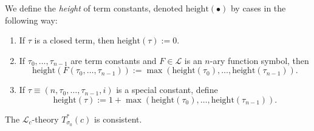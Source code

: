 \begin{definition}
We define the \emph{height} of term constants, denoted $\mathrm{height}(\bullet)$ by cases in the following way: 
\begin{enumerate}
    \item If $\tau$ is a closed term, then $\mathrm{height}(\tau):= 0$.
    \item If $\tau_0,\dots,\tau_{n-1}$ are term constants and $F\in\mathcal{L}$ is an $n$-ary function symbol, then 
    $$
        \mathrm{height}(F(\tau_0,\dots,\tau_{n-1})) := \max(\mathrm{height}(\tau_0),\dots,\mathrm{height}(\tau_{n-1})). 
    $$
    \item If $\tau\equiv (n,\tau_0,\dots,\tau_{n-1},i)$ is a special constant, define 
    $$
        \mathrm{height}(\tau):= 1 + \max(\mathrm{height}(\tau_0),\dots,\mathrm{height}(\tau_{n-1})).
    $$
\end{enumerate}
\end{definition}
\begin{lemma}
    The $\mathcal{L}_c$-theory $T^\ast_{\sigma_0}(c)$ is consistent.
\end{lemma}
